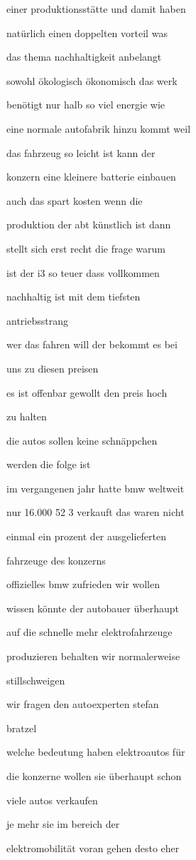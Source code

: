 \documentclass[a4paper, 11pt]{book} %
\begin{document}
einer produktionsstätte und damit haben

natürlich einen doppelten vorteil was

das thema nachhaltigkeit anbelangt

sowohl ökologisch ökonomisch das werk

benötigt nur halb so viel energie wie

eine normale autofabrik hinzu kommt weil

das fahrzeug so leicht ist kann der

konzern eine kleinere batterie einbauen

auch das spart kosten wenn die

produktion der abt künstlich ist dann

stellt sich erst recht die frage warum

ist der i3 so teuer dass vollkommen

nachhaltig ist mit dem tiefsten

antriebsstrang

wer das fahren will der bekommt es bei

uns zu diesen preisen

es ist offenbar gewollt den preis hoch

zu halten

die autos sollen keine schnäppchen

werden die folge ist

im vergangenen jahr hatte bmw weltweit

nur 16.000 52 3 verkauft das waren nicht

einmal ein prozent der ausgelieferten

fahrzeuge des konzerns

offizielles bmw zufrieden wir wollen

wissen könnte der autobauer überhaupt

auf die schnelle mehr elektrofahrzeuge

produzieren behalten wir normalerweise

stillschweigen

wir fragen den autoexperten stefan

bratzel

welche bedeutung haben elektroautos für

die konzerne wollen sie überhaupt schon

viele autos verkaufen

je mehr sie im bereich der

elektromobilität voran gehen desto eher
\end{document}
